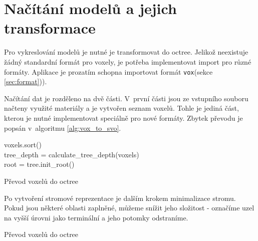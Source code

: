 \section{Načítání modelů a jejich transformace} \label{sec:voxel_conversion}
Pro vykreslování modelů je nutné je transformovat do octree. Jelikož neexistuje žádný standardní formát pro voxely, je potřeba implementovat import pro různé formáty. Aplikace je prozatím schopna importovat formát \texttt{vox}(sekce \ref{sec:format})).

Načítání dat je rozděleno na dvě části. V~první části jsou ze vstupního souboru načteny využité materiály a je vytvořen seznam voxelů. Tohle je jediná část, kterou je nutné implementovat speciálně pro nové formáty. Zbytek převodu je popsán v~algoritmu \ref{alg:vox_to_svo}.


\begin{center}
	\begin{czechalgorithm}[H] \label{alg:vox_to_svo}
		voxels.sort() \\
		tree\_depth = calculate\_tree\_depth(voxels)\\
		root = tree.init\_root()\\
		\caption{Převod voxelů do octree}
	\end{czechalgorithm}
\end{center}

Po vytvoření stromové reprezentace je dalším krokem minimalizace stromu. Pokud jsou některé oblasti zaplněné, můžeme snížit jeho složitost - označíme uzel na vyšší úrovni jako terminální a jeho potomky odstraníme.

\begin{center}
	\begin{czechalgorithm}[H] \label{alg:minimize_svo}


		\caption{Převod voxelů do octree}
	\end{czechalgorithm}
\end{center}

